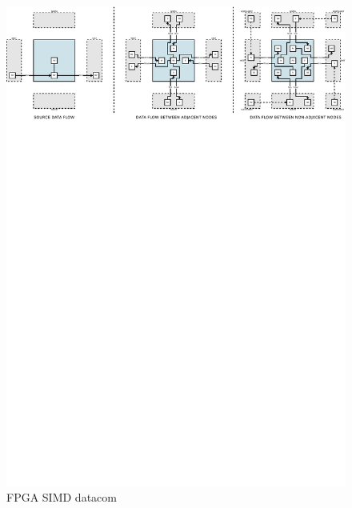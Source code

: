 \begin{figure}[h]
  \centering
  \includegraphics[width=\linewidth,clip,trim=0 22cm 0 0]
                  {fig/fpga/fpga-simd-datacom.pdf}
  \caption{FPGA SIMD datacom}
  \label{fig:fpga-simd-datacom}
\end{figure}
